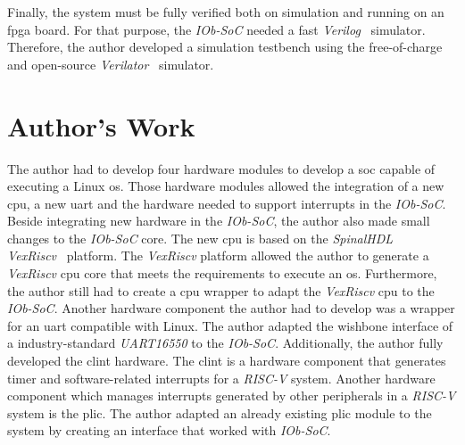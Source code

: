 Finally, the system must be fully verified both on simulation and running on an \acrshort{fpga} board. For that purpose, the \textit{IOb-SoC} needed a fast \textit{Verilog}~\cite{thomas2008verilog} simulator. Therefore, the author developed a simulation testbench using the free-of-charge and open-source \textit{Verilator}~\cite{snyder2010verilator} simulator.

\section{Author's Work}
\label{section:authors_work}
The author had to develop four hardware modules to develop a \acrfull{soc} capable of executing a Linux \acrshort{os}. Those hardware modules allowed the integration of a new \acrshort{cpu}, a new \acrshort{uart} and the hardware needed to support interrupts in the \textit{IOb-SoC}. Beside integrating new hardware in the \textit{IOb-SoC}, the author also made small changes to the \textit{IOb-SoC} core. The new \acrshort{cpu} is based on the \textit{SpinalHDL}~\cite{papon2017spinalhdl} \textit{VexRiscv}~\cite{vexriscv} platform. The \textit{VexRiscv} platform allowed the author to generate a \textit{VexRiscv} \acrshort{cpu} core that meets the requirements to execute an \acrlong{os}. Furthermore, the author still had to create a \acrshort{cpu} wrapper to adapt the \textit{VexRiscv} \acrshort{cpu} to the \textit{IOb-SoC}. Another hardware component the author had to develop was a wrapper for an \acrshort{uart} compatible with Linux. The author adapted the wishbone interface of a industry-standard \textit{UART16550} to the \textit{IOb-SoC}. Additionally, the author fully developed the \acrshort{clint} hardware. The \acrshort{clint} is a hardware component that generates timer and software-related interrupts for a \textit{RISC-V} system. Another hardware component which manages interrupts generated by other peripherals in a \textit{RISC-V} system is the \acrshort{plic}. The author adapted an already existing \acrshort{plic} module to the system by creating an interface that worked with \textit{IOb-SoC}.

